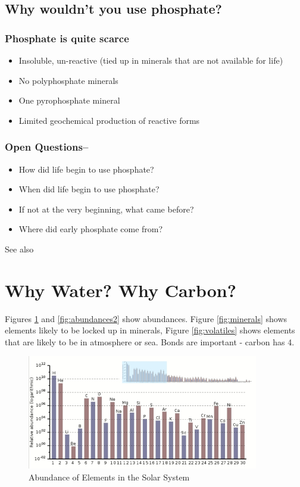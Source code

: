 \documentclass[]{article}
\begin{document}
\subsection{Why wouldn't you use phosphate?}

\subsubsection{Phosphate is quite scarce\cite{keefe1995polyphosphates}}
\begin{itemize}
	\item Insoluble, un-reactive (tied up in minerals that are not available for life)
	\item No polyphosphate minerals
	\item One pyrophosphate mineral
	\item Limited geochemical production of reactive forms
\end{itemize}
\subsubsection{Open Questions--\cite{life2017special}}

\begin{itemize}
	\item How did life begin to use phosphate?
	\item When did life begin to use phosphate?
	\item If not at the very beginning, what came before?\cite{goldford2017remnants}
	\item Where did early phosphate come from?
\end{itemize}

See also \cite{westheimer1987nature}
\section{Why Water? Why Carbon?}
Figures \ref{fig:abundances1} and \ref{fig:abundances2} show abundances. Figure \ref{fig:minerals} shows elements likely to be locked up in minerals, Figure \ref{fig:volatiles} shows elements that are likely to be in atmosphere or sea. Bonds are important - carbon has 4.

\begin{figure}[H]
	\caption{Abundance of Elements in the Solar System}\label{fig:abundances1} 
	\includegraphics[width=0.9\textwidth]{Abundances}
\end{figure}
\end{document}
